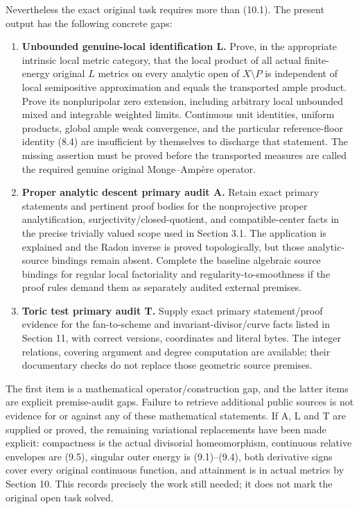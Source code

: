 \documentclass[
  10pt,
]{article}
\providecommand{\tightlist}{%
  \setlength{\itemsep}{0pt}\setlength{\parskip}{0pt}}
\begin{document}
Nevertheless the exact original task requires more than (10.1). The
present output has the following concrete gaps:

\begin{enumerate}
\def\labelenumi{\arabic{enumi}.}
\tightlist
\item
  \textbf{Unbounded genuine-local identification L.} Prove, in the
  appropriate intrinsic local metric category, that the local product of
  all actual finite-energy original \(L\) metrics on every analytic open
  of \(X\setminus P\) is independent of local semipositive approximation
  and equals the transported ample product. Prove its nonpluripolar zero
  extension, including arbitrary local unbounded mixed and integrable
  weighted limits. Continuous unit identities, uniform products, global
  ample weak convergence, and the particular reference-floor identity
  (8.4) are insufficient by themselves to discharge that statement. The
  missing assertion must be proved before the transported measures are
  called the required genuine original Monge--Ampère operator.
\item
  \textbf{Proper analytic descent primary audit A.} Retain exact primary
  statements and pertinent proof bodies for the nonprojective proper
  analytification, surjectivity/closed-quotient, and compatible-center
  facts in the precise trivially valued scope used in Section 3.1. The
  application is explained and the Radon inverse is proved
  topologically, but those analytic-source bindings remain absent.
  Complete the baseline algebraic source bindings for regular local
  factoriality and regularity-to-smoothness if the proof rules demand
  them as separately audited external premises.
\item
  \textbf{Toric test primary audit T.} Supply exact primary
  statement/proof evidence for the fan-to-scheme and
  invariant-divisor/curve facts listed in Section 11, with correct
  versions, coordinates and literal bytes. The integer relations,
  covering argument and degree computation are available; their
  documentary checks do not replace those geometric source premises.
\end{enumerate}

The first item is a mathematical operator/construction gap, and the
latter items are explicit premise-audit gaps. Failure to retrieve
additional public sources is not evidence for or against any of these
mathematical statements. If A, L and T are supplied or proved, the
remaining variational replacements have been made explicit: compactness
is the actual divisorial homeomorphism, continuous relative envelopes
are (9.5), singular outer energy is (9.1)--(9.4), both derivative signs
cover every original continuous function, and attainment is in actual
metrics by Section 10. This records precisely the work still needed; it
does not mark the original open task solved.
\end{document}
